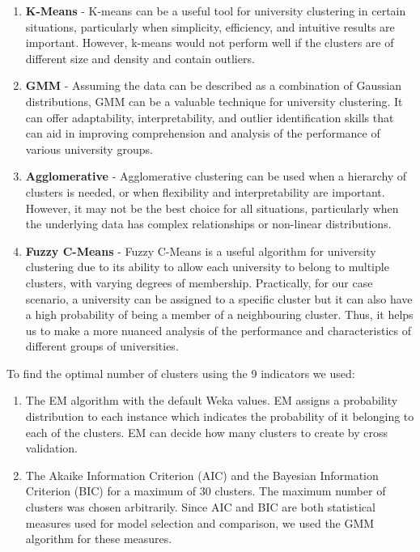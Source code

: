 \documentclass[conference]{IEEEtran}
\begin{document}
\begin{enumerate}
    \item \textbf{K-Means} - K-means can be a useful tool for university clustering in certain situations, particularly when simplicity, efficiency, and intuitive results are important. However, k-means would not perform well if the clusters are of different size and density and contain outliers.
    \item \textbf{GMM} - Assuming the data can be described as a combination of Gaussian distributions, GMM can be a valuable technique for university clustering. It can offer adaptability, interpretability, and outlier identification skills that can aid in improving comprehension and analysis of the performance of various university groups.
    \item \textbf{Agglomerative} - Agglomerative clustering can be used when a hierarchy of clusters is needed, or when flexibility and interpretability are important. However, it may not be the best choice for all situations, particularly when the underlying data has complex relationships or non-linear distributions.
    \item \textbf{Fuzzy C-Means} - Fuzzy C-Means is a useful algorithm for university clustering due to its ability to allow each university to belong to multiple clusters, with varying degrees of membership. Practically, for our case scenario, a university can be assigned to a specific cluster but it can also have a high probability of being a member of a neighbouring cluster. Thus, it helps us to make a more nuanced analysis of the performance and characteristics of different groups of universities. \\
\end{enumerate}

To find the optimal number of clusters using the 9 indicators we used: \\

\begin{enumerate}
    \item The EM algorithm with the default Weka values. EM assigns a probability distribution to each instance which indicates the probability of it belonging to each of the clusters. EM can decide how many clusters to create by cross validation.
    \item The Akaike Information Criterion (AIC) and the Bayesian Information Criterion (BIC) for a maximum of 30 clusters. The maximum number of clusters was chosen arbitrarily. Since AIC and BIC are both statistical measures used for model selection and comparison, we used the GMM algorithm for these measures.  \\
\end{enumerate}
\end{document}
